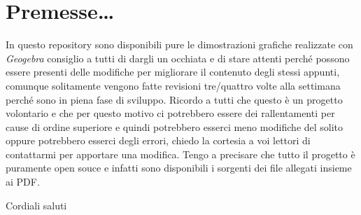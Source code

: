 \section{Premesse\dots}
In questo repository sono disponibili pure le dimostrazioni grafiche realizzate
con \textit{Geogebra} consiglio a tutti di dargli un occhiata e di stare
attenti perché possono essere presenti delle modifiche per migliorare il
contenuto degli stessi appunti, comunque solitamente vengono fatte revisioni
tre/quattro volte alla settimana perché sono in piena fase di sviluppo. Ricordo
a tutti che questo è un progetto volontario e che per questo motivo ci
potrebbero essere dei rallentamenti per cause di ordine superiore e quindi
potrebbero esserci meno modifiche del solito oppure potrebbero esserci degli
errori, chiedo la cortesia a voi lettori di contattarmi per apportare una
modifica. Tengo a precisare che tutto il progetto è puramente open souce e
infatti sono disponibili i sorgenti dei file allegati insieme ai PDF.
\begin{center}
	Cordiali saluti
\end{center}
\newpage
